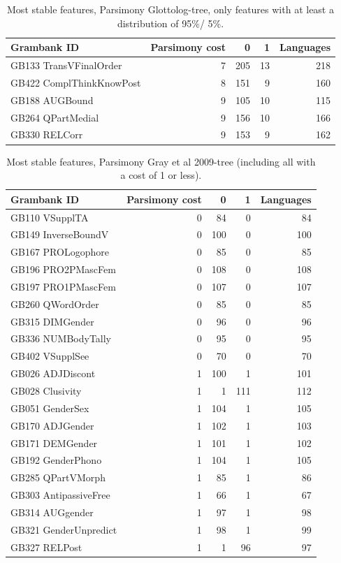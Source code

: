 \documentclass[draft,10pt]{article} %
\begin{document}
\begin{table}[H]
\centering
\begin{tabular}{lrrrr}
  \hline
Grambank ID & Parsimony cost & 0 & 1 & Languages \\ 
  \hline
GB133 TransVFinalOrder & 7 & 205 & 13 & 218 \\ 
  GB422 ComplThinkKnowPost & 8 & 151 & 9 & 160 \\ 
  GB188 AUGBound & 9 & 105 & 10 & 115 \\ 
  GB264 QPartMedial & 9 & 156 & 10 & 166 \\ 
  GB330 RELCorr & 9 & 153 & 9 & 162 \\ 
   \hline
\end{tabular}
\caption{Most stable features, Parsimony Glottolog-tree, only features with at least a distribution of 95\%/ 5\%.} 
\label{stable_parsimony_glottolog_5_percent}
\end{table}

\begin{table}[H]
\centering
\begin{tabular}{lrrrr}
  \hline
Grambank ID & Parsimony cost & 0 & 1 & Languages \\ 
  \hline
GB110 VSupplTA & 0 & 84 & 0 & 84 \\ 
  GB149 InverseBoundV & 0 & 100 & 0 & 100 \\ 
  GB167 PROLogophore & 0 & 85 & 0 & 85 \\ 
  GB196 PRO2PMascFem & 0 & 108 & 0 & 108 \\ 
  GB197 PRO1PMascFem & 0 & 107 & 0 & 107 \\ 
  GB260 QWordOrder & 0 & 85 & 0 & 85 \\ 
  GB315 DIMGender & 0 & 96 & 0 & 96 \\ 
  GB336 NUMBodyTally & 0 & 95 & 0 & 95 \\ 
  GB402 VSupplSee & 0 & 70 & 0 & 70 \\ 
  GB026 ADJDiscont & 1 & 100 & 1 & 101 \\ 
  GB028 Clusivity & 1 & 1 & 111 & 112 \\ 
  GB051 GenderSex & 1 & 104 & 1 & 105 \\ 
  GB170 ADJGender & 1 & 102 & 1 & 103 \\ 
  GB171 DEMGender & 1 & 101 & 1 & 102 \\ 
  GB192 GenderPhono & 1 & 104 & 1 & 105 \\ 
  GB285 QPartVMorph & 1 & 85 & 1 & 86 \\ 
  GB303 AntipassiveFree & 1 & 66 & 1 & 67 \\ 
  GB314 AUGgender & 1 & 97 & 1 & 98 \\ 
  GB321 GenderUnpredict & 1 & 98 & 1 & 99 \\ 
  GB327 RELPost & 1 & 1 & 96 & 97 \\ 
   \hline
\end{tabular}
\caption{Most stable features, Parsimony Gray et al 2009-tree (including all with a cost of 1 or less).} 
\label{stable_parsimony_gray}
\end{table}
\end{document}
